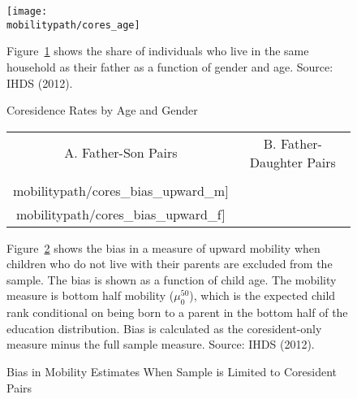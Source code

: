 \begin{figure}[H]
  \caption{Coresidence Rates by Age and Gender} 
  \label{fig:cores_rates}
  \begin{center}
    \texttt{[image: \\mobilitypath/cores\_age]}
  \end{center}
  \newline
  \footnotesize{Figure~\ref{fig:cores_rates} shows the share of
    individuals who live in the same household as their father as a
    function of gender and age. Source: IHDS (2012).}  
\end{figure}

\begin{figure}[h]
  \caption{Bias in Mobility Estimates When Sample is Limited to Coresident Pairs} 
  \label{fig:cores_bias}

  \begin{center}
    \begin{tabular}{cc}
      A. Father-Son Pairs &        B. Father-Daughter Pairs  \\
      \texttt{[image: \\mobilitypath/cores\_bias\_upward\_m]} & 
      \texttt{[image: \\mobilitypath/cores\_bias\_upward\_f]} \\
      \end{tabular}          
  \end{center}
  \newline
  \footnotesize{Figure~\ref{fig:cores_bias} shows the bias in a
    measure of upward mobility when children who do not live with
    their parents are excluded from the sample. The bias is shown as a function of
    child age. The mobility measure is bottom half mobility
    ($\mu_0^{50}$), which is the expected child rank conditional on
    being born to a parent in the bottom half of the education
    distribution. Bias is calculated as the coresident-only measure
    minus the full sample measure. Source: IHDS (2012).}
\end{figure}

